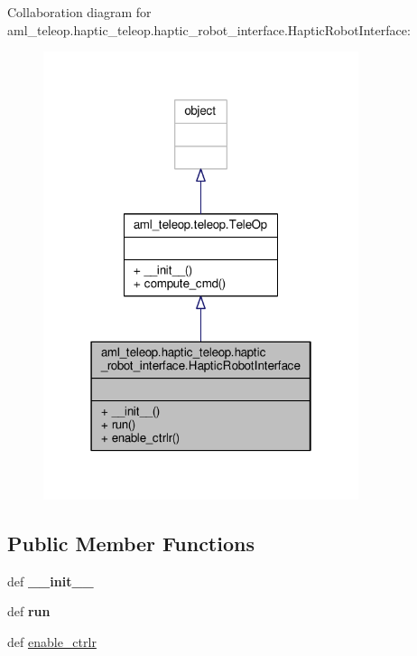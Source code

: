 Collaboration diagram for aml\-\_\-teleop.\-haptic\-\_\-teleop.\-haptic\-\_\-robot\-\_\-interface.\-Haptic\-Robot\-Interface\-:
\nopagebreak
\begin{figure}[H]
\begin{center}
\leavevmode
\includegraphics[width=262pt]{classaml__teleop_1_1haptic__teleop_1_1haptic__robot__interface_1_1_haptic_robot_interface__coll__graph}
\end{center}
\end{figure}
\subsection*{Public Member Functions}
\begin{DoxyCompactItemize}
\item 
\hypertarget{classaml__teleop_1_1haptic__teleop_1_1haptic__robot__interface_1_1_haptic_robot_interface_a8740a05d1ec3cc21eb369d6b0b39b67e}{def {\bfseries \-\_\-\-\_\-init\-\_\-\-\_\-}}\label{classaml__teleop_1_1haptic__teleop_1_1haptic__robot__interface_1_1_haptic_robot_interface_a8740a05d1ec3cc21eb369d6b0b39b67e}

\item 
\hypertarget{classaml__teleop_1_1haptic__teleop_1_1haptic__robot__interface_1_1_haptic_robot_interface_a8dfac6dfaa5a0feb989a6515456c7ef9}{def {\bfseries run}}\label{classaml__teleop_1_1haptic__teleop_1_1haptic__robot__interface_1_1_haptic_robot_interface_a8dfac6dfaa5a0feb989a6515456c7ef9}

\item 
def \hyperlink{classaml__teleop_1_1haptic__teleop_1_1haptic__robot__interface_1_1_haptic_robot_interface_a114f9bb2e1859a99d9e4b9880df44ef9}{enable\-\_\-ctrlr}
\end{DoxyCompactItemize}


